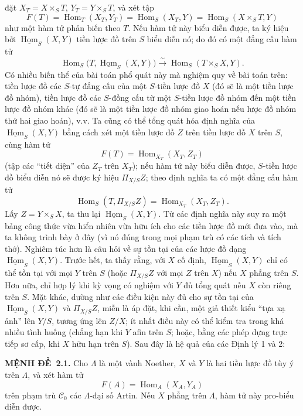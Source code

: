 \documentclass[11pt,twoside,openany]{book}
\numberwithin{equation}{section}
\newcommand{\src}[1]{%
  \phantomsection\hypertarget{src:\fgasourceid:#1}{}%
  \marginpar{\raggedleft\footnotesize\sffamily #1}%
}
\newcommand{\fgasourceid}{unset}
\newcommand{\result}[2]{\par\medskip\noindent\textbf{#1\if\relax\detokenize{#2}\relax\else\ #2\fi.}\quad}
\begin{document}
\src{381}
đặt $X_T=X\times_ST$, $Y_T=Y\times_ST$, và xét tập
\[
  F(T)=\operatorname{Hom}_T(X_T,Y_T)
      =\operatorname{Hom}_S(X_T,Y)
      =\operatorname{Hom}_S(X\times_ST,Y)
\]
như một hàm tử phản biến theo $T$. Nếu hàm tử này biểu diễn được, ta ký hiệu
bởi $\underline{\operatorname{Hom}}_S(X,Y)$ tiền lược đồ trên $S$ biểu diễn
nó; do đó có một đẳng cấu hàm tử
\[
  \operatorname{Hom}_S
  \bigl(T,\underline{\operatorname{Hom}}_S(X,Y)\bigr)
  \xrightarrow{\sim}
  \operatorname{Hom}_S(T\times_SX,Y).
\]
Có nhiều biến thể của bài toán phổ quát này mà nghiệm quy về bài toán trên:
tiền lược đồ các $S$-tự đẳng cấu của một $S$-tiền lược đồ $X$ (đó sẽ là một
tiền lược đồ nhóm), tiền lược đồ các $S$-đồng cấu từ một $S$-tiền lược đồ nhóm
đến một tiền lược đồ nhóm khác (đó sẽ là một tiền lược đồ nhóm giao hoán nếu
lược đồ nhóm thứ hai giao hoán), v.v. Ta cũng có thể tổng quát hóa định nghĩa
của $\underline{\operatorname{Hom}}_S(X,Y)$ bằng cách xét một tiền lược đồ $Z$
trên tiền lược đồ $X$ trên $S$, cùng hàm tử
\[
  F(T)=\operatorname{Hom}_{X_T}(X_T,Z_T)
\]
(tập các ``tiết diện'' của $Z_T$ trên $X_T$); nếu hàm tử này biểu diễn được,
$S$-tiền lược đồ biểu diễn nó sẽ được ký hiệu $\Pi_{X/S}Z$; theo định nghĩa ta
có một đẳng cấu hàm tử
\[
  \operatorname{Hom}_S(T,\Pi_{X/S}Z)
  =\operatorname{Hom}_{X_T}(X_T,Z_T).
\]
Lấy $Z=Y\times_SX$, ta thu lại
$\underline{\operatorname{Hom}}_S(X,Y)$. Từ các định nghĩa này suy ra một bảng
công thức vừa hiển nhiên vừa hữu ích cho các tiền lược đồ mới đưa vào, mà ta
không trình bày ở đây (vì nó đúng trong mọi phạm trù có các tích và tích thớ).
Nghiêm túc hơn là câu hỏi về sự tồn tại của các lược đồ dạng
$\underline{\operatorname{Hom}}_S(X,Y)$. Trước hết, ta thấy rằng, với $X$ cố
định, $\underline{\operatorname{Hom}}_S(X,Y)$ chỉ có thể tồn tại với mọi $Y$
trên $S$ (hoặc $\Pi_{X/S}Z$ với mọi $Z$ trên $X$) nếu $X$ phẳng trên $S$.
Hơn nữa, chỉ hợp lý khi kỳ vọng có nghiệm với $Y$ đủ tổng quát nếu $X$ còn
riêng trên $S$. Mặt khác, dường như các điều kiện này đủ cho sự tồn tại của
$\underline{\operatorname{Hom}}_S(X,Y)$ và $\Pi_{X/S}Z$, miễn là áp đặt, khi
cần, một giả thiết kiểu ``tựa xạ ảnh'' lên $Y/S$, tương ứng lên $Z/X$; ít nhất
điều này có thể kiểm tra trong khá nhiều tình huống (chẳng hạn khi $Y$ afin
trên $S$; hoặc, bằng các phép dựng trực tiếp sơ cấp, khi $X$ hữu hạn trên $S$).
Sau đây là hệ quả của các Định lý 1 và 2:

\src{382}
\result{MỆNH ĐỀ}{2.1} Cho $\Lambda$ là một vành Noether, $X$ và $Y$ là hai
tiền lược đồ tùy ý trên $\Lambda$, và xét hàm tử
\[
  F(A)=\operatorname{Hom}_A(X_A,Y_A)
\]
trên phạm trù $\mathcal C_0$ các $\Lambda$-đại số Artin. Nếu $X$ phẳng trên
$\Lambda$, hàm tử này pro-biểu diễn được.
\end{document}
